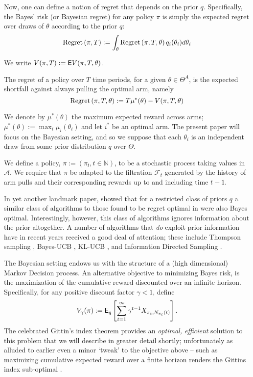 Now, one can define a notion of regret that depends on the prior $q$. Specifically, the Bayes' risk (or Bayesian regret) for any policy $\pi$ is simply the expected regret over draws of $\theta$ according to the prior $q$:
\[
\textnormal{Regret} \left( \pi, T \right) := \int_\theta \textnormal{Regret} \left( \pi, T, \theta \right) q_i(\theta_i)d\theta_i
\]
 




We write $V(\pi,T) := \mathsf{E}{V(\pi,T,\theta)}$. 

The regret of a policy over $T$ time periods, for a given $\theta \in \Theta^A$, is the expected shortfall against always pulling the optimal arm, namely
\[
\textnormal{Regret} \left( \pi, T, \theta \right) := 
T \mu^*(\theta) -
V(\pi, T, \theta)
\]



We denote by $\mu^*(\theta)$ the maximum expected reward across arms;  $\mu^*(\theta) := \max_i \mu_i(\theta_i)$ and let $i^*$ be an optimal arm. The present paper will focus on the Bayesian setting, and so we suppose that each $\theta_i$ is an independent draw from some prior distribution $q$ over $\Theta$. 

We define a policy, $\pi := (\pi_t, t \in \mathbb{N})$, to be a stochastic process taking values in $\mathcal{A}$. We require that $\pi$ be adapted to the filtration $\mathcal{F}_t$ generated by the history of arm pulls and their corresponding rewards up to and including time $t-1$.

In yet another landmark paper, \cite{lai1985asymptotically} showed that for a restricted class of priors $q$ a similar class of algorithms to those found to be regret optimal in \cite{lai1985asymptotically} were also Bayes optimal. Interestingly, however, this class of algorithms ignores information about the prior altogether. A number of algorithms that {\em do} exploit prior information have in recent years received a good deal of attention; these include Thompson sampling \cite{thompson1933likelihood}, Bayes-UCB \cite{kaufmann2012thompson}, KL-UCB \cite{garivier2011kl}, and Information Directed Sampling \cite{russo2014learning}. 

The Bayesian setting endows us with the structure of a (high dimensional) Markov Decision process. An alternative objective to minimizing Bayes risk, is the maximization of the cumulative reward discounted over an infinite horizon. Specifically, for any positive discount factor $\gamma < 1$, define
\[
V_\gamma(\pi) := 
\mathsf{E}_q \left[
	\sum_{t=1}^\infty \gamma^{t-1} X_{\pi_t,N_{\pi_t}(t)}
\right].
\]
The celebrated Gittin's index theorem provides an {\em optimal, efficient} solution to this problem that we will describe in greater detail shortly; unfortunately as alluded to earlier even a minor `tweak' to the objective above -- such as maximizing cumulative expected reward over a finite horizon renders the Gittins index sub-optimal \cite{nino2011computing}. 

